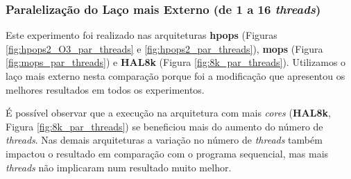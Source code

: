 \documentclass[a4paper, 12pt]{article}
\begin{document}
\subsubsection{Paralelização do Laço mais Externo (de 1 a 16 \textit{threads})}

Este experimento foi realizado nas arquiteturas \textbf{hpops}
(Figuras \ref{fig:hpops2_O3_par_threads} e \ref{fig:hpops2_par_threads}),
\textbf{mops} (Figura \ref{fig:mops_par_threads}) e \textbf{HAL8k}
(Figura \ref{fig:8k_par_threads}). Utilizamos o laço mais externo
nesta comparação porque foi a modificação que apresentou os melhores
resultados em todos os experimentos.

É possível observar que a execução na arquitetura com mais \textit{cores}
(\textbf{HAL8k}, Figura \ref{fig:8k_par_threads}) se beneficiou mais
do aumento do número de \textit{threads}. Nas demais arquiteturas a
variação no número de \textit{threads} também impactou o resultado em
comparação com o programa sequencial, mas mais \textit{threads} não
implicaram num resultado muito melhor.
\end{document}
